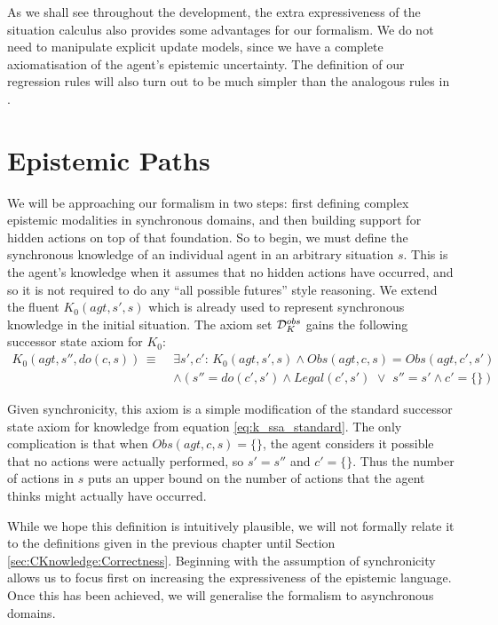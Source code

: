 As we shall see throughout the development, the extra expressiveness
of the situation calculus also provides some advantages for our formalism.
We do not need to manipulate explicit update models, since we have
a complete axiomatisation of the agent's epistemic uncertainty. The
definition of our regression rules will also turn out to be much simpler
than the analogous rules in \citep{vanBenthem06lcc}.


\section{Epistemic Paths\label{sec:CKnowledge:Epistemic-Paths}}

We will be approaching our formalism in two steps: first defining
complex epistemic modalities in synchronous domains, and then building
support for hidden actions on top of that foundation. So to begin,
we must define the synchronous knowledge of an individual agent in
an arbitrary situation $s$. This is the agent's knowledge when it
assumes that no hidden actions have occurred, and so it is not required
to do any {}``all possible futures'' style reasoning. We extend
the fluent $K_{0}(agt,s',s)$ which is already used to represent synchronous
knowledge in the initial situation. The axiom set $\mathcal{D}_{K}^{obs}$
gains the following successor state axiom for $K_{0}$:\begin{align}
K_{0}(agt,s'',do(c,s))\,\equiv\,\, & \exists s',c':\, K_{0}(agt,s',s)\wedge Obs(agt,c,s)=Obs(agt,c',s')\nonumber \\
 & \wedge\left(s''=do(c',s')\wedge Legal(c',s')\,\,\vee\,\, s''=s'\wedge c'=\{\}\right)\label{eq:K0_ssa}\end{align}


Given synchronicity, this axiom is a simple modification of the standard
successor state axiom for knowledge from equation \eqref{eq:k_ssa_standard}.
The only complication is that when $Obs(agt,c,s)=\{\}$, the agent
considers it possible that no actions were actually performed, so
$s'=s''$ and $c'=\{\}$. Thus the number of actions in $s$ puts
an upper bound on the number of actions that the agent thinks might
actually have occurred.

While we hope this definition is intuitively plausible, we will not
formally relate it to the definitions given in the previous chapter
until Section \ref{sec:CKnowledge:Correctness}. Beginning with the
assumption of synchronicity allows us to focus first on increasing
the expressiveness of the epistemic language. Once this has been achieved,
we will generalise the formalism to asynchronous domains.

